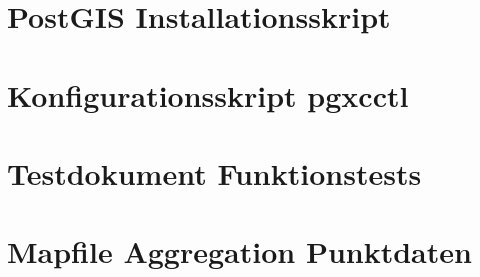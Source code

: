 \section{PostGIS Installationsskript}

\newpage
\section{Konfigurationsskript pgxcctl}

\newpage
\section{Testdokument Funktionstests}

\newpage
\section{Mapfile Aggregation Punktdaten}

												

\pagestyle{empty}


